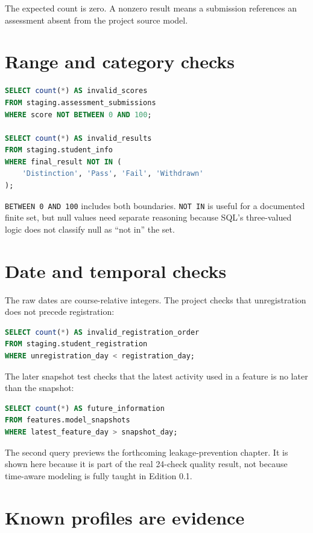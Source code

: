 The expected count is zero. A nonzero result means a submission references an
assessment absent from the project source model.

\section{Range and category checks}

\begin{lstlisting}[language=SQL,caption={Implemented validation patterns for
scores and outcomes.}]
SELECT count(*) AS invalid_scores
FROM staging.assessment_submissions
WHERE score NOT BETWEEN 0 AND 100;

SELECT count(*) AS invalid_results
FROM staging.student_info
WHERE final_result NOT IN (
    'Distinction', 'Pass', 'Fail', 'Withdrawn'
);
\end{lstlisting}

\texttt{BETWEEN 0 AND 100} includes both boundaries. \texttt{NOT IN} is useful
for a documented finite set, but null values need separate reasoning because
SQL's three-valued logic does not classify null as ``not in'' the set.

\section{Date and temporal checks}

The raw dates are course-relative integers. The project checks that
unregistration does not precede registration:

\begin{lstlisting}[language=SQL]
SELECT count(*) AS invalid_registration_order
FROM staging.student_registration
WHERE unregistration_day < registration_day;
\end{lstlisting}

The later snapshot test checks that the latest activity used in a feature is no
later than the snapshot:

\begin{lstlisting}[language=SQL]
SELECT count(*) AS future_information
FROM features.model_snapshots
WHERE latest_feature_day > snapshot_day;
\end{lstlisting}

The second query previews the forthcoming leakage-prevention chapter. It is
shown here because it is part of the real 24-check quality result, not because
time-aware modeling is fully taught in Edition 0.1.

\section{Known profiles are evidence}

